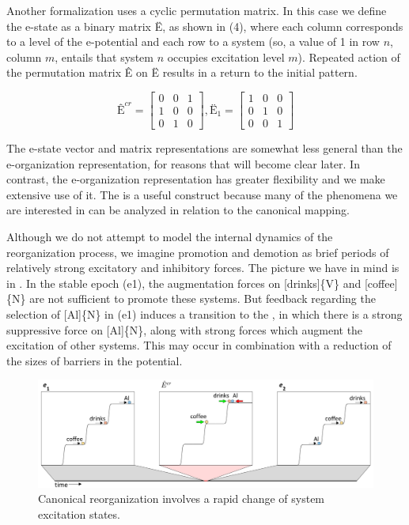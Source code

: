   Another formalization uses a cyclic permutation matrix. In this case we define the e-state as a binary matrix Ë, as shown in (4), where each column corresponds to a level of the e-potential and each row to a system (so, a value of 1 in row $n$, column $m$, entails that system $n$ occupies excitation level $m$). Repeated action of the permutation matrix Ê on Ë results in a return to the initial pattern. 

\ea
$$
\text{Ê}^{{cr}}=
\left[
  \begin{matrix}
  0 & 0 & 1\\
  1 & 0 & 0\\
  0 & 1 & 0
  \end{matrix}
\right],
{\text{Ë}}_{1}=
\left[
  \begin{matrix}
  1 & 0 & 0\\
  0 & 1 & 0\\
  0 & 0 & 1
  \end{matrix}
\right]
$$
\z


  The e-state vector and matrix representations are somewhat less general than the e-organization representation, for reasons that will become clear later. In contrast, the e-organization representation has greater flexibility and we make extensive use of it. The  is a useful construct because many of the phenomena we are interested in can be analyzed in relation to the canonical mapping.

  Although we do not attempt to model the internal dynamics of the reorganization process, we imagine promotion and demotion as brief periods of relatively strong excitatory and inhibitory forces. The picture we have in mind is in {}. In the stable epoch (e1), the augmentation forces on [drinks]\{V\} and [coffee]\{N\} are not sufficient to promote these systems. But feedback regarding the selection of [Al]\{N\} in (e1) induces a transition to the , in which there is a strong suppressive force on [Al]\{N\}, along with strong forces which augment the excitation of other systems. This may occur in combination with a reduction of the sizes of barriers in the potential. 

  
\begin{figure}
\includegraphics[width=\textwidth]{figures/Tilsen-img26.png}
\caption{Canonical reorganization involves a rapid change of system excitation states.}
\label{fig:2:19}
\end{figure}
 

